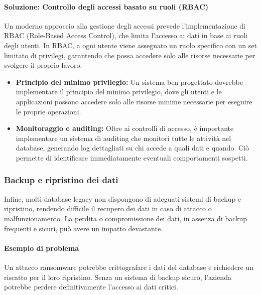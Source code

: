 \paragraph{Soluzione: Controllo degli accessi basato su ruoli (RBAC)}
Un moderno approccio alla gestione degli accessi prevede l'implementazione di RBAC (Role-Based Access Control), che limita l'accesso ai dati in base ai ruoli degli utenti. In RBAC, a ogni utente viene assegnato un ruolo specifico con un set limitato di privilegi, garantendo che possa accedere solo alle risorse necessarie per svolgere il proprio lavoro.
\begin{itemize}
    \item \textbf{Principio del minimo privilegio:} Un sistema ben progettato dovrebbe implementare il principio del minimo privilegio, dove gli utenti e le applicazioni possono accedere solo alle risorse minime necessarie per eseguire le proprie operazioni.
    \item \textbf{Monitoraggio e auditing:} Oltre ai controlli di accesso, è importante implementare un sistema di auditing che monitori tutte le attività nel database, generando log dettagliati su chi accede a quali dati e quando. Ciò permette di identificare immediatamente eventuali comportamenti sospetti.
\end{itemize}

\subsubsection{Backup e ripristino dei dati}
Infine, molti database legacy non dispongono di adeguati sistemi di backup e ripristino, rendendo difficile il recupero dei dati in caso di attacco o malfunzionamento. La perdita o compromissione dei dati, in assenza di backup frequenti e sicuri, può avere un impatto devastante.

\paragraph{Esempio di problema}
Un attacco ransomware potrebbe crittografare i dati del database e richiedere un riscatto per il loro ripristino. Senza un sistema di backup sicuro, l'azienda potrebbe perdere definitivamente l'accesso ai dati critici.

